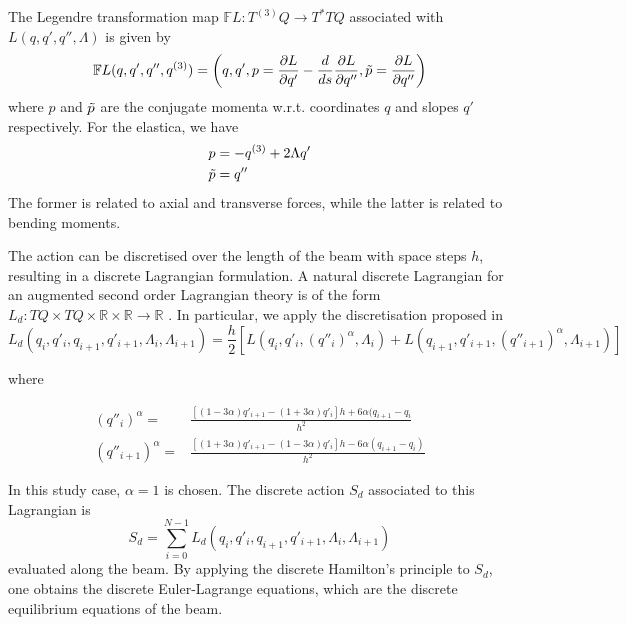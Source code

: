 The Legendre transformation map $\mathbb{F} L: T^{(3)} Q \rightarrow T^*TQ$ associated with $L(q,q',q'',\Lambda)$ is given by \cite{colombo2016}
\begin{align}
    \mathbb{F} L (q, q', q'', q^{(3)}) = \left( q, q', 
     p = \frac{\partial L}{\partial q'} - \frac{d}{ds} \frac{\partial L}{\partial q''}, 
    \Tilde{p} = \frac{\partial L}{\partial q''} \right)
\end{align}
where $p$ and $\Tilde{p}$ are the conjugate momenta w.r.t. coordinates $q$ and slopes $q'$ respectively. For the elastica, we have
\begin{equation}
    \begin{split}
        p &= - q^{(3)} + 2 \Lambda q' \\
        \Tilde{p} &= q'' 
    \end{split}
\end{equation}
The former is related to axial and transverse forces, while the latter is related to bending moments.
 
The action can be discretised over the length of the beam with space steps $h$, resulting in a discrete Lagrangian formulation. A natural discrete Lagrangian for an augmented second order Lagrangian theory is of the form $L_d: TQ \times TQ \times \mathbb{R} \times \mathbb{R} \rightarrow \mathbb{R}$ \cite{colombo2016}. In particular, we apply the discretisation proposed in \cite{ferraro2021}
\begin{equation}\label{eq:Ld_static_elastica}
    L_d \left( q_i, q'_i, q_{i+1}, q'_{i+1}, \Lambda_i, \Lambda_{i+1} \right) = \frac{h}{2} \left[ L (q_i,q'_i,(q''_i)^\alpha,\Lambda_i) + L (q_{i+1},q'_{i+1},(q''_{i+1})^\alpha, \Lambda_{i+1}) \right]
\end{equation}

where

\begin{align}
    (q''_i)^{\alpha} =& \frac{\left[ (1-3\alpha) q'_{i+1} - (1+3\alpha) q'_i \right] h + 6 \alpha (q_{i+1} - q_i}{h^2} \\
    (q''_{i+1})^{\alpha} =& \frac{\left[ (1+3\alpha) q'_{i+1} - (1-3\alpha) q'_i \right] h - 6 \alpha (q_{i+1} - q_i)}{h^2}
\end{align}


In this study case, $\alpha=1$ is chosen. The discrete action $S_d$ associated to this Lagrangian is
\begin{equation}
    S_d = \sum_{i=0}^{N-1} L_d \left( q_i, q'_i, q_{i+1}, q'_{i+1}, \Lambda_i, \Lambda_{i+1} \right)
\end{equation}
evaluated along the beam. By applying the discrete Hamilton's principle to $S_d$, one obtains the discrete Euler-Lagrange equations, which are the discrete equilibrium equations of the beam.

